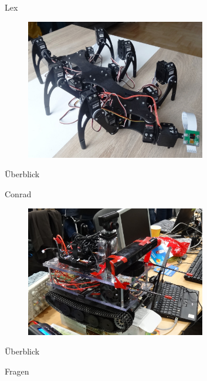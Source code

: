 \documentclass{beamer}
\begin{document}
\begin{frame}{Lex}
 \begin{figure}[H]
  \centering
  \includegraphics[width=0.7\textwidth]{./images/robot-lex.jpg}
 \end{figure}
\end{frame}
\begin{frame}{\"Uberblick}

\end{frame}
\begin{frame}{Conrad}
 \begin{figure}[H]
  \centering
  \includegraphics[width=0.7\textwidth]{./images/robot-conrad.jpg}
 \end{figure}
\end{frame}
\begin{frame}{\"Uberblick}

\end{frame}
\begin{frame}
	\Huge{\centerline{Fragen}}
\end{frame}
\end{document}
